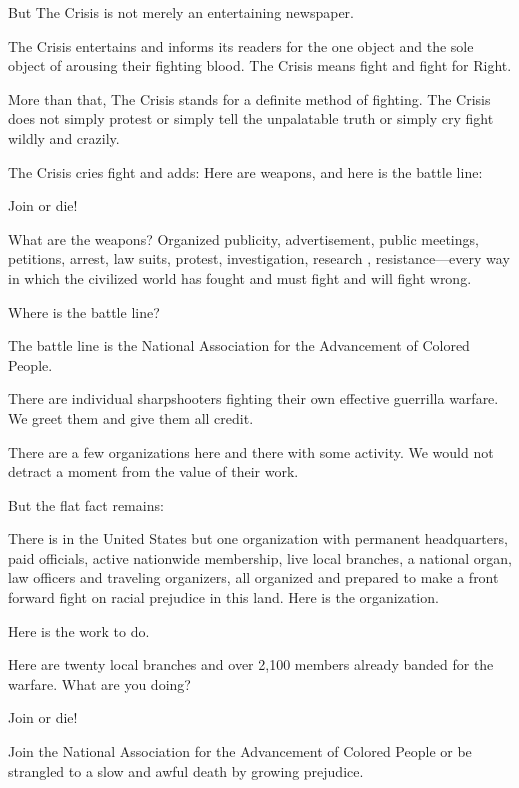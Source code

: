 \documentclass[letterpaper,10pt,english]{jupyterBook}
\begin{document}
\sphinxAtStartPar
But The Crisis is not merely an entertaining newspaper.

\sphinxAtStartPar
The Crisis entertains and informs its readers for the one object and the sole object of arousing their fighting blood. The Crisis means fight and fight for Right.

\sphinxAtStartPar
More than that, The Crisis stands for a definite method of fighting. The Crisis does not simply protest or simply tell the unpalatable truth or simply cry fight wildly and crazily.

\sphinxAtStartPar
The Crisis cries fight and adds: Here are weapons, and here is the battle line:

\sphinxAtStartPar
Join or die!

\sphinxAtStartPar
What are the weapons? Organized publicity, advertisement, public meetings, petitions, arrest, law suits, protest, investigation, research , resistance—every way in which the civilized world has fought and must fight and will fight wrong.

\sphinxAtStartPar
Where is the battle line?

\sphinxAtStartPar
The battle line is the National Association for the Advancement of Colored People.

\sphinxAtStartPar
There are individual sharpshooters fighting their own effective guerrilla warfare. We greet them and give them all credit.

\sphinxAtStartPar
There are a few organizations here and there with some activity. We would not detract a moment from the value of their work.

\sphinxAtStartPar
But the flat fact remains:

\sphinxAtStartPar
There is in the United States but one organization with permanent headquarters, paid officials, active nation­wide membership, live local branches, a national organ, law officers and traveling organizers, all organized and prepared to make a front forward fight on racial prejudice in this land.
Here is the organization.

\sphinxAtStartPar
Here is the work to do.

\sphinxAtStartPar
Here are twenty local branches and over 2,100 members already banded for the warfare.
What are you doing?

\sphinxAtStartPar
Join or die!

\sphinxAtStartPar
Join the National Association for the Advancement of Colored People or be strangled to a slow and awful death by growing prejudice.
\end{document}
